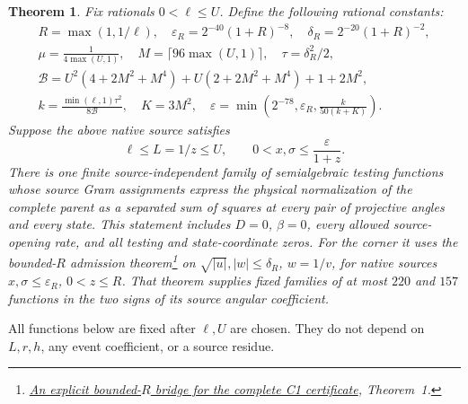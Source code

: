 \documentclass[11pt]{article}
\newtheorem{theorem}{Theorem}
\begin{document}
\begin{theorem}\label{thm:bounded-unit}
Fix rationals $0<\ell\le U$. Define the following rational constants:
\begin{gather*}
 R=\max(1,1/\ell),\quad
 \varepsilon_R=2^{-40}(1+R)^{-8},\quad
 \delta_R=2^{-20}(1+R)^{-2},\\
 \mu=\frac1{4\max(U,1)},\quad
 M=\lceil96\max(U,1)\rceil,\quad\tau=\delta_R^2/2,\\
 \mathcal B=U^2(4+2M^2+M^4)+U(2+2M^2+M^4)+1+2M^2,\\
 k=\frac{\min(\ell,1)\tau^2}{8\mathcal B},\quad K=3M^2,\quad
 \varepsilon=\min\left(2^{-78},\varepsilon_R,
                                  \frac{k}{50(k+K)}\right).
\end{gather*}
Suppose the above native source satisfies
\[
 \ell\le L=1/z\le U,\qquad
 0<x,\sigma\le\frac\varepsilon{1+z}.
\]
There is one finite source-independent family of semialgebraic testing
functions whose source Gram assignments express the physical normalization of the complete parent
as a separated sum of squares at every pair of projective angles and
every state. This statement includes $D=0$, $\beta=0$, every allowed
source-opening rate, and all testing and state-coordinate zeros.
For the corner it uses the bounded-$R$ admission theorem\footnote{\href{../bounded_R/bounded_R_bridge.pdf}{An explicit bounded-$R$ bridge for the complete C1 certificate}, Theorem~1.} on
$\sqrt{|u|},|w|\le\delta_R$, $w=1/v$, for native sources
$x,\sigma\le\varepsilon_R$, $0<z\le R$.
That theorem supplies fixed families of at most $220$ and $157$
functions in the two signs of its source angular coefficient.
\end{theorem}

All functions below are fixed after $\ell,U$ are chosen. They do not depend
on $L,r,h$, any event coefficient, or a source residue.
\end{document}
